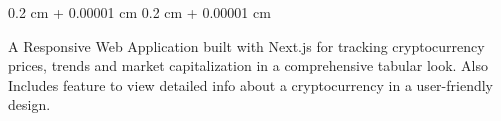 \documentclass[10pt, letterpaper]{article}
\newenvironment{onecolentry}{
    \begin{adjustwidth}{
        0.2 cm + 0.00001 cm
    }{
        0.2 cm + 0.00001 cm
    }
}{
    \end{adjustwidth}
}
\begin{document}
        \vspace{0.10 cm}
        \begin{onecolentry}
            A Responsive Web Application built with Next.js for tracking cryptocurrency prices, trends and market  capitalization in a comprehensive tabular look. Also Includes feature to view detailed info about a cryptocurrency in a user-friendly design.
        \end{onecolentry}
\end{document}
